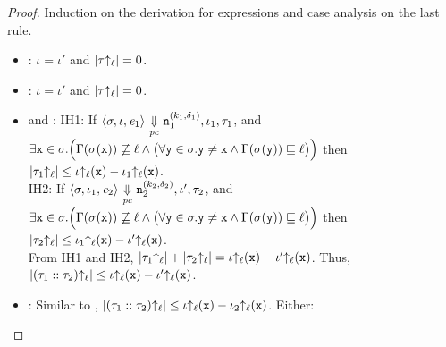 \begin{proof}
  Induction on the derivation for expressions and case analysis on the
  last rule. 
  \begin{itemize}[leftmargin=.5in]
  \item{}: $\iota = \iota'$ and $|\tau{\uparrow_\ell}| = 0$. 
  \item{}: $\iota = \iota'$ and $|\tau{\uparrow_\ell}| = 0$. 
  \item{} and : IH1: If $\langle \sigma, \iota, \mathit{e}_1 \rangle {~\underset{\mathit{pc}}{\Downarrow}~}  
    \texttt{n}_1^{(k_1, \delta_1)}, \iota_1, \tau_1$, and \\
    $\exists \texttt{x} \in \sigma. \Big(\Gamma(\sigma(\texttt{x}))
    \not\sqsubseteq \ell \wedge \big(\forall \texttt{y} \in \sigma. \texttt{y} \neq \texttt{x} \wedge
    \Gamma(\sigma(\texttt{y})) \sqsubseteq \ell\big)\Big)$ then 
    $|\tau_1{\uparrow_\ell}| \leq \iota{\uparrow_\ell}(\texttt{x}) - \iota_1{\uparrow_\ell}(\texttt{x})$. \\
    IH2: If $\langle \sigma, \iota_1, \mathit{e}_2 \rangle {~\underset{\mathit{pc}}{\Downarrow}~}  
    \texttt{n}_2^{(k_2, \delta_2)}, \iota', \tau_2$, and \\
$\exists \texttt{x} \in \sigma. \Big(\Gamma(\sigma(\texttt{x}))
\not\sqsubseteq \ell \wedge \big(\forall \texttt{y} \in \sigma. \texttt{y} \neq \texttt{x} \wedge
\Gamma(\sigma(\texttt{y})) \sqsubseteq \ell\big)\Big)$ then  
    $|\tau_2{\uparrow_\ell}| \leq \iota_1{\uparrow_\ell}(\texttt{x}) - \iota'{\uparrow_\ell}(\texttt{x})$. \\
    From IH1 and IH2, $|\tau_1{\uparrow_\ell}| + |\tau_2{\uparrow_\ell}| = \iota{\uparrow_\ell}(\texttt{x}) -
    \iota'{\uparrow_\ell}(\texttt{x})$. Thus, $|(\tau_1::\tau_2){\uparrow_\ell}| \leq \iota{\uparrow_\ell}(\texttt{x}) -
    \iota'{\uparrow_\ell}(\texttt{x})$.
  \item{}: Similar to , $|(\tau_1::\tau_2){\uparrow_\ell}| \leq \iota{\uparrow_\ell}(\texttt{x}) -
    \iota_2{\uparrow_\ell}(\texttt{x})$. Either:
\end{itemize}
\end{proof}
